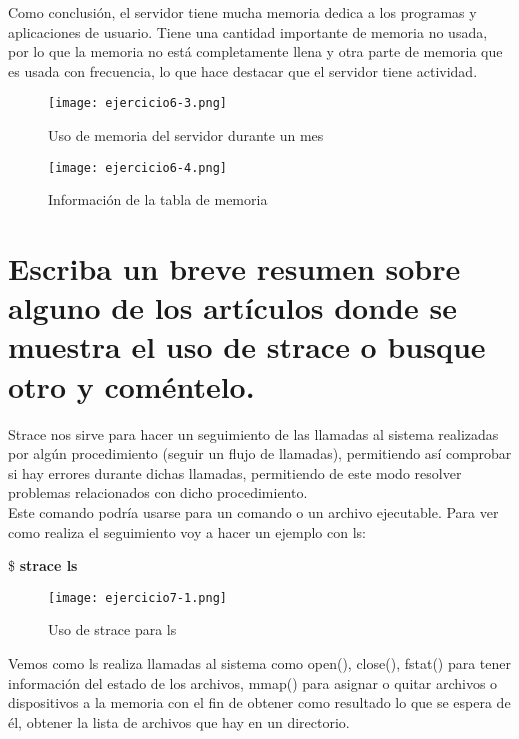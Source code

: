 	Como conclusión, el servidor tiene mucha memoria dedica a los programas y aplicaciones de usuario. Tiene una cantidad importante de memoria no usada, por lo que la memoria no está completamente llena y otra parte de memoria que es usada con frecuencia, lo que hace destacar que el servidor tiene actividad.
	\begin{figure}[H] 
		\centering
		\texttt{[image: ejercicio6-3.png]} 
		\label{figura2} 			
		\caption{Uso de memoria del servidor durante un mes}
	\end{figure}
	\begin{figure}[H] 
		\centering
		\texttt{[image: ejercicio6-4.png]} 
		\label{figura2} 			
		\caption{Información de la tabla de memoria}
	\end{figure}
	\section{Escriba un breve resumen sobre alguno de los artículos donde se muestra el uso de strace o busque otro y coméntelo.}
	
	Strace nos sirve para hacer un seguimiento de las llamadas al sistema realizadas por algún procedimiento (seguir un flujo de llamadas), permitiendo así comprobar si hay errores durante dichas llamadas, permitiendo de este modo resolver problemas relacionados con dicho 
	procedimiento.\\
	
	Este comando podría usarse para un comando o un archivo ejecutable. Para ver como realiza el seguimiento voy a hacer un ejemplo con ls\cite{ejercicio7-1}:
	\begin{center}
		\$ \textbf{strace ls}
	\end{center}
	\begin{figure}[H] 
		\centering
		\texttt{[image: ejercicio7-1.png]} 
		\label{figura2} 			
		\caption{Uso de strace para ls}
	\end{figure}
	
	Vemos como ls realiza llamadas al sistema como open(), close(), fstat() para tener información del estado de los archivos, mmap() para asignar o quitar archivos o dispositivos a la memoria con el fin de obtener como resultado lo que se espera de él, obtener la lista de archivos que hay en un directorio.
